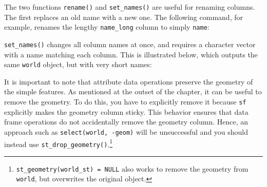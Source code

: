 \documentclass[]{krantz}
\newenvironment{Shaded}{\begin{snugshade}}{\end{snugshade}}
\newcommand{\CommentTok}[1]{\textcolor[rgb]{0.37,0.37,0.37}{\textit{#1}}}
\newcommand{\DataTypeTok}[1]{\textcolor[rgb]{0.27,0.27,0.27}{#1}}
\newcommand{\KeywordTok}[1]{\textcolor[rgb]{0.27,0.27,0.27}{\textbf{#1}}}
\newcommand{\NormalTok}[1]{#1}
\newcommand{\OperatorTok}[1]{\textcolor[rgb]{0.43,0.43,0.43}{\textbf{#1}}}
\newcommand{\StringTok}[1]{\textcolor[rgb]{0.5,0.5,0.5}{#1}}
\let\rmarkdownfootnote\footnote%
\def\footnote{\protect\rmarkdownfootnote}
\begin{document}
The two functions \texttt{rename()} and \texttt{set\_names()} are useful for renaming columns.
The first replaces an old name with a new one.
The following command, for example, renames the lengthy \texttt{name\_long} column to simply \texttt{name}:

\begin{Shaded}
\end{Shaded}

\texttt{set\_names()} changes all column names at once, and requires a character vector with a name matching each column.
This is illustrated below, which outputs the same \texttt{world} object, but with very short names:

\begin{Shaded}
\end{Shaded}

It is important to note that attribute data operations preserve the geometry of the simple features.
As mentioned at the outset of the chapter, it can be useful to remove the geometry.
To do this, you have to explicitly remove it because \texttt{sf} explicitly makes the geometry column sticky.
This behavior ensures that data frame operations do not accidentally remove the geometry column.
Hence, an approach such as \texttt{select(world,\ -geom)} will be unsuccessful and you should instead use \texttt{st\_drop\_geometry()}.\footnote{\texttt{st\_geometry(world\_st)\ =\ NULL} also works to remove the geometry from \texttt{world}, but overwrites the original object.}

\begin{Shaded}
\end{Shaded}
\end{document}
